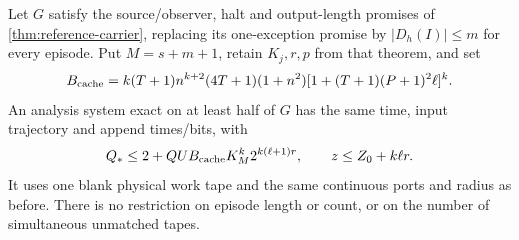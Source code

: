 \begin{theorem}\label{thm:historical-cache}
\notformalized
Let $G$ satisfy the source/observer, halt and output-length promises of
\cref{thm:reference-carrier}, replacing its one-exception promise by
$|D_h(I)|\le m$ for every episode. Put $M=s+m+1$, retain $K_j,r,p$
from that theorem, and set
\[
 B_{\rm cache}=k(T+1)n^{k+2}(4T+1)(1+n^2)
                  [1+(T+1)(P+1)^2\ell]^k.
\]
An analysis system exact on at least half of $G$ has the same time, input
trajectory and append times/bits, with
\[
 Q_*\le2+QU B_{\rm cache}K_M^k2^{k(\ell+1)r},\qquad
 z\le Z_0+k\ell r.
\]
It uses one blank physical work tape and the same continuous ports and
radius as before. There is no restriction on episode length or count,
or on the number of simultaneous unmatched tapes.
\end{theorem}
